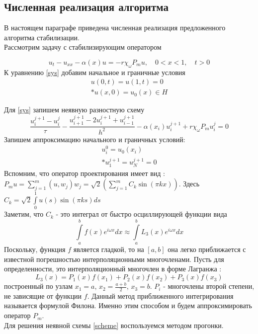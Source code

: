 \subsection{Численная реализация алгоритма}
\vspace{1em}

В настоящем параграфе приведена численная реализация предложенного алгоритма стабилизации.\\

Рассмотрим задачу с стабилизирующим оператором

\begin{equation}\label{sys}
u_t - u_{xx} - \alpha(x) u = -r\chi_{\omega}P_m u, \quad 0 < x < 1, \quad t > 0
\end{equation}
К уравнению \eqref{sys} добавим начальное и граничные условия
\begin{gather}\label{s_control}
u(0, t) = u(1, t) = 0 \\*
u(x, 0) = u_{0}(x) \in H \nonumber
\end{gather}

Для \eqref{sys} запишем неявную разностную схему \\
\begin{equation}\label{scheme}
  \frac{u^{j + 1}_i - u^j_i}{\tau} - \frac{u_{i + 1}^{j + 1} - 2u_{i}^{j + 1} + u_{i - 1}^{j + 1}}{h^2} - \alpha(x_{i}) u_{i}^{j + 1} + r\chi_{\omega}P_m u^j_i = 0
\end{equation}
Запишем аппроксимацию начального и граничных условий:\\
\begin{gather}
u_i^0 = u_0(x_i) \\*
u_1^{j+1} = u_N^{j+1} = 0 \nonumber
\end{gather}
Вспомним, что оператор проектирования имеет вид :\\
$P_m u = \sum \limits_{j=1}^{m} {(u, w_j) w_j} = \sqrt{2} (\sum \limits_{j=1}^{m} {C_k \sin{(\pi k x)}})$. Здесь $C_k = \sqrt{2} \int\limits_0^1{u(s)\sin{(\pi k s)} ds}$\\
Заметим, что $C_k$ - это интеграл от быстро осциллирующей функции вида
\begin{equation}
  \int\limits_a^b{f(x) e^{i\omega x} dx} \approx \int\limits_a^b{L_3(x) e^{i\omega x} dx}
\end{equation}
Поскольку, функция $f$ является гладкой, то на $[a, b]$ она легко приближается с известной погрешностью интерполяционными многочленами. Пусть для определенности, это интерполяционный многочлен в форме Лагранжа :
\begin{equation}
  L_3(x) = P_1(x)f(x_1) + P_2(x)f(x_2) + P_3(x)f(x_3)
\end{equation}
построенный по узлам $x_1 = a$, $x_2 = \frac{a + b}{2}$, $x_3 = b$. $P_i$ - многочлены второй степени, не зависящие от функции $f$. Данный метод приближенного интегрирования называется формулой Филона. Именно этим способом и будем аппроксимировать оператор $P_m$.\\

Для решения неявной схемы \eqref{scheme} воспользуемся методом прогонки.